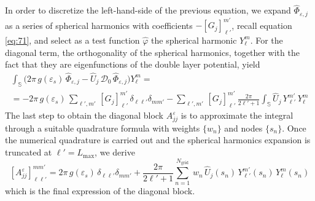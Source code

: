 In order to discretize the left-hand-side of the previous equation, we expand $\hat{\Phi}_{\varepsilon,j}$ as a series of spherical harmonics with coefficients $-[G_j]_{\ell'}^{m'}$, recall equation \eqref{eq:71}, and select as a test function $\hat{\varphi}$  the spherical harmonic $Y_{\ell}^{m}$. For the diagonal term, the orthogonality of the spherical harmonics, together with the fact that they are eigenfunctions of the double layer potential, yield
\begin{multline*}
 \int_{\mathbb{S}}\big( 2\pi \, g(\varepsilon_s) \, \hat{\Phi}_{\varepsilon,j} - \hat{U}_j \, {\mathcal{D}}_0 \, \hat{\Phi}_{\varepsilon,j} \big) Y_\ell^m = \\
= - 2 \pi  \, g(\varepsilon_s) \, \sum_{\ell',m'}  \, [G_j]_{\ell'}^{m'} \, \delta_{\ell \ell'} \delta_{mm'}  - \sum_{\ell',m'} \, [G_j]_{\ell'}^{m'} \, \frac{2\pi}{2\ell'+1} \int_{\mathbb{S}} \hat{U}_j \,  Y_{\ell'}^{m'}\, Y_\ell^m
\end{multline*}
The last step to obtain the diagonal block $A_{jj}^\varepsilon$ is to approximate the integral through a suitable quadrature formula with weights $\{w_n\}$ and nodes $\{ s_n\}$. Once the numerical quadrature is carried out and the spherical harmonics expansion is truncated at $\ell' = L_\text{max}$, we derive
\begin{equation}\label{eq:ajj}
[A_{jj}^\varepsilon]_{\ell \ell'}^{mm'} = 2\pi \, g(\varepsilon_s) %
 \,  \delta_{\ell \ell'} \delta_{mm'} + \frac{2\pi}{2\ell'+1} \sum_{n=1}^{N_\text{grid}} \, w_n \, \hat{U}_j(s_n)  \, Y_{\ell'}^{m'}(s_n)\,  Y_\ell^m(s_n)
\end{equation}
which is the final expression of the diagonal block.


